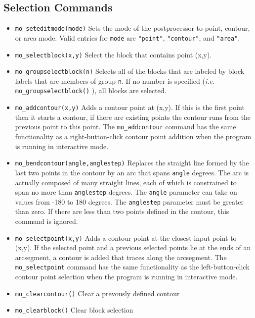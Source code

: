 \subsection{Selection Commands}
\begin{itemize}
\item{\tt mo\_seteditmode(mode)} Sets the mode of the postprocessor to
point, contour, or area mode.  Valid entries for {\tt mode} are
{\tt "point"}, {\tt "contour"}, and {\tt "area"}.
\item{\tt mo\_selectblock(x,y)} Select the block that contains point (x,y).
\item{\tt mo\_groupselectblock(n)} Selects all of the blocks that are labeled by block
        labels that are members of group {\tt n}. If no number is specified ({\em i.e.} {\tt mo\_groupselectblock()} ),
                all blocks are selected.

\item{\tt mo\_addcontour(x,y)} Adds a contour point at (x,y). If this
is the first point then it starts a contour, if there are existing
points the contour runs from the previous point to this point. The
{\tt mo\_addcontour} command has the same functionality as a
right-button-click contour point addition when the program is
running in interactive mode.
\item{\tt mo\_bendcontour(angle,anglestep)} Replaces the straight line
formed by the last two points in the contour by an arc that spans {\tt angle}
degrees.  The arc is actually composed of many straight lines, each
of which is constrained to span no more than {\tt anglestep} degrees.
The {\tt angle} parameter can take on values from -180 to 180 degrees.
The {\tt anglestep} parameter must be greater than zero.  If there are less
than two points defined in the contour, this command is ignored.
\item{\tt mo\_selectpoint(x,y)} Adds a contour point at the closest
input point to (x,y).  If the selected point and a previous
selected points lie at the ends of an arcsegment, a contour is
added that traces along the arcsegment.  The {\tt mo\_selectpoint}
command has the same functionality as the left-button-click contour
point selection when the program is running in interactive mode.
\item{\tt mo\_clearcontour()} Clear a prevously defined contour
\item{\tt mo\_clearblock()} Clear block selection
\end{itemize}


